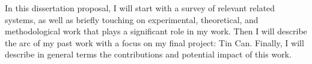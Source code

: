 \documentclass{tufte-handout}
\begin{document}





In this dissertation proposal, I will start with a survey of relevant related systems, as well as briefly touching on experimental, theoretical, and methodological work that plays a significant role in my work. Then I will describe the arc of my past work with a focus on my final project: Tin Can. Finally, I will describe in general terms the contributions and potential impact of this work.


\end{document}
